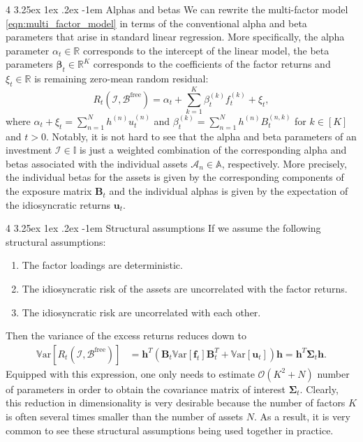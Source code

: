 \documentclass[12pt]{article}
\makeatletter
\renewcommand\paragraph{%
	\@startsection{paragraph}
	{4}
	{\z@}
	{3.25ex \@plus1ex \@minus.2ex}
	{-1em}
	{\normalfont\normalsize\bfseries\maybe@addperiod}%
}
\newcommand{\maybe@addperiod}[1]{%
	#1\@addpunct{.}%
}
\makeatother
\begin{document}
\paragraph{Alphas and betas} We can rewrite the multi-factor model \eqref{eqn:multi_factor_model} in terms of the conventional alpha and beta parameters that arise in standard linear regression. More specifically, the alpha parameter $\alpha_t \in \mathbb{R}$ corresponds to the intercept of the linear model, the beta parameters $\boldsymbol{\beta}_t \in \mathbb{R}^K$ corresponds to the coefficients of the factor returns and $\xi_t \in \mathbb{R}$ is remaining zero-mean random residual:
\begin{equation}
	R_t(\mathcal{I}, \mathcal{B}^{\text{free}}) 
	= \alpha_t + \sum_{k=1}^K \beta_t^{(k)} f_t^{(k)} + \xi_t,
\end{equation}
where $\alpha_t + \xi_t = \sum_{n=1}^N h^{(n)} u_t^{(n)}$ and $\beta_t^{(k)} = \sum_{n=1}^N h^{(n)} B_t^{(n, k)}$ for $k \in [K]$ and $t > 0$. Notably, it is not hard to see that the alpha and beta parameters of an investment $\mathcal{I} \in \mathbb{I}$ is just a weighted combination of the corresponding alpha and betas associated with the individual assets $\mathcal{A}_n \in \mathbb{A}$, respectively. More precisely, the individual betas for the assets is given by the corresponding components of the exposure matrix $\mathbf{B}_t$ and the individual alphas is given by the expectation of the idiosyncratic returns $\mathbf{u}_t$.

\paragraph{Structural assumptions} If we assume the following structural assumptions:
\begin{enumerate}
	\item The factor loadings are deterministic.
	\item The idiosyncratic risk of the assets are uncorrelated with the factor returns.
	\item The idiosyncratic risk are uncorrelated with each other.
\end{enumerate}
Then the variance of the excess returns reduces down to
\begin{align}
	\mathbb{V}\text{ar}[R_t(\mathcal{I}, \mathcal{B}^{\text{free}})]
	&= \mathbf{h}^T \left( \mathbf{B}_t\mathbb{V}\text{ar}[\mathbf{f}_t] \mathbf{B}_t^T + \mathbb{V}\text{ar}[\mathbf{u}_t]\right) \mathbf{h}
	= \mathbf{h}^T \boldsymbol{\Sigma}_t \mathbf{h}.
\end{align}
Equipped with this expression, one only needs to estimate $\mathcal{O}(K^2 + N)$ number of parameters in order to obtain the covariance matrix of interest $\boldsymbol{\Sigma}_t$. Clearly, this reduction in dimensionality is very desirable because the number of factors $K$ is often several times smaller than the number of assets $N$. As a result, it is very common to see these structural assumptions being used together in practice. 
\end{document}

